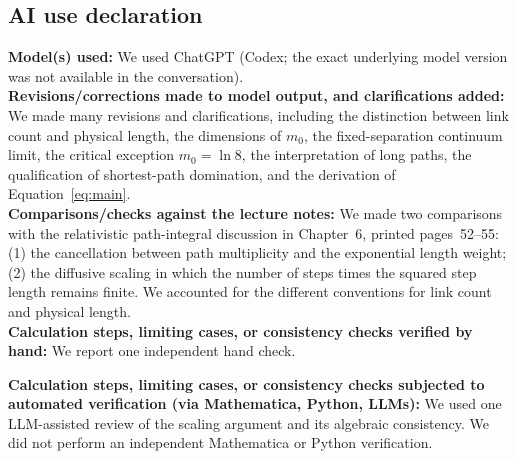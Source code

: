\documentclass[11pt,a4paper]{article}
\numberwithin{equation}{section}
\begin{document}
\subsection*{AI use declaration}

\textbf{Model(s) used:}
We used ChatGPT (Codex; the exact underlying model
version was not available in the conversation).\\

\textbf{Revisions/corrections made to model output,
and clarifications added:}
We made many revisions and clarifications,
including the distinction between link count
and physical length, the dimensions of $m_0$,
the fixed-separation continuum limit, the
critical exception $m_0=\ln8$, the interpretation
of long paths, the qualification of
shortest-path domination, and the derivation
of Equation~\eqref{eq:main}.\\

\textbf{Comparisons/checks against the lecture notes:}
We made two comparisons with the relativistic
path-integral discussion in Chapter~6,
printed pages~52--55:
(1) the cancellation between path multiplicity
and the exponential length weight;
(2) the diffusive scaling in which the number
of steps times the squared step length remains
finite. We accounted for the different
conventions for link count and physical length.\\

\textbf{Calculation steps, limiting cases, or
consistency checks verified by hand:}
We report one independent hand check.

\textbf{Calculation steps, limiting cases, or
consistency checks subjected to automated
verification (via Mathematica, Python, LLMs):}
We used one LLM-assisted review of the scaling
argument and its algebraic consistency.
We did not perform an independent Mathematica
or Python verification.
\end{document}
